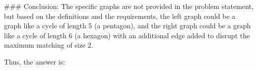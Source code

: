 ### Conclusion:
The specific graphs are not provided in the problem statement, but based on the definitions and the requirements, the left graph could be a graph like a cycle of length 5 (a pentagon), and the right graph could be a graph like a cycle of length 6 (a hexagon) with an additional edge added to disrupt the maximum matching of size 2.

Thus, the answer is:

